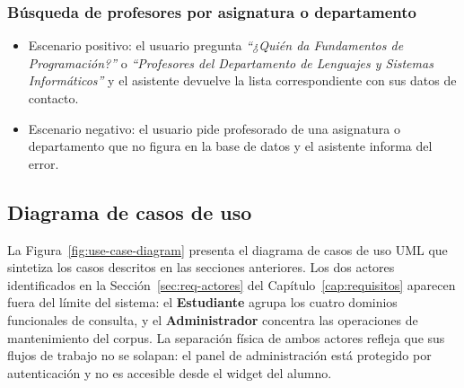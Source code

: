 \subsubsection{Búsqueda de profesores por asignatura o departamento}

\begin{itemize}
    \item Escenario positivo: el usuario pregunta \textit{``¿Quién da Fundamentos de Programación?''} o \textit{``Profesores del Departamento de Lenguajes y Sistemas Informáticos''} y el asistente devuelve la lista correspondiente con sus datos de contacto.
    \item Escenario negativo: el usuario pide profesorado de una asignatura o departamento que no figura en la base de datos y el asistente informa del error.
\end{itemize}

\subsection{Diagrama de casos de uso}\label{subsec:cu-diagrama}

La Figura~\ref{fig:use-case-diagram} presenta el diagrama de casos de uso UML que sintetiza los casos descritos en las secciones anteriores. Los dos actores identificados en la Sección~\ref{sec:req-actores} del Capítulo~\ref{cap:requisitos} aparecen fuera del límite del sistema: el \textbf{Estudiante} agrupa los cuatro dominios funcionales de consulta, y el \textbf{Administrador} concentra las operaciones de mantenimiento del corpus. La separación física de ambos actores refleja que sus flujos de trabajo no se solapan: el panel de administración está protegido por autenticación y no es accesible desde el widget del alumno.

